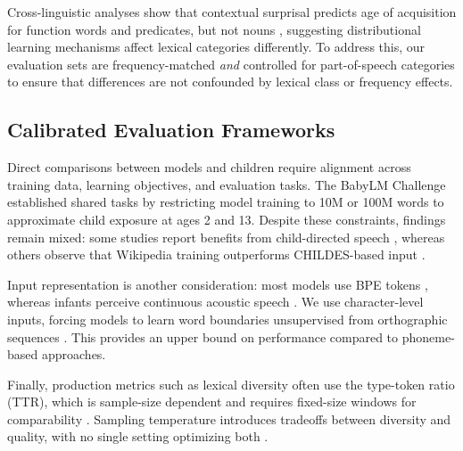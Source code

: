 
Cross-linguistic analyses show that contextual surprisal predicts age of acquisition for function words and predicates, but not nouns \citep{portelance2023predicting}, suggesting distributional learning mechanisms affect lexical categories differently. To address this, our evaluation sets are frequency-matched \emph{and} controlled for part-of-speech categories to ensure that differences are not confounded by lexical class or frequency effects.



\subsection{Calibrated Evaluation Frameworks}

Direct comparisons between models and children require alignment across training data, learning objectives, and evaluation tasks\citep{warstadt2022what}. The BabyLM Challenge \citep{warstadt2023findings,hu2024findings,charpentier2025findings} established shared tasks by restricting model training to 10M or 100M words to approximate child exposure at ages 2 and 13. Despite these constraints, findings remain mixed: some studies report benefits from child-directed speech \citep{feng2024child}, whereas others observe that Wikipedia training outperforms CHILDES-based input \citep{padovani2025child}.

Input representation is another consideration: most models use BPE tokens \citep{huebner2021babyberta,evanson2023language}, whereas infants perceive continuous acoustic speech \citep{dupoux2018cognitive}. We use character-level inputs, forcing models to learn word boundaries unsupervised from orthographic sequences \citep{bunzeck2024graphemes,goriely2024babble}. This provides an upper bound on performance compared to phoneme-based approaches. 


Finally, production metrics such as lexical diversity often use the type-token ratio (TTR), which is sample-size dependent \citep{richards1987type} and requires fixed-size windows for comparability \citep{mckee2022measurement}. Sampling temperature introduces tradeoffs between diversity and quality, with no single setting optimizing both \citep{verine2025improving}. 

